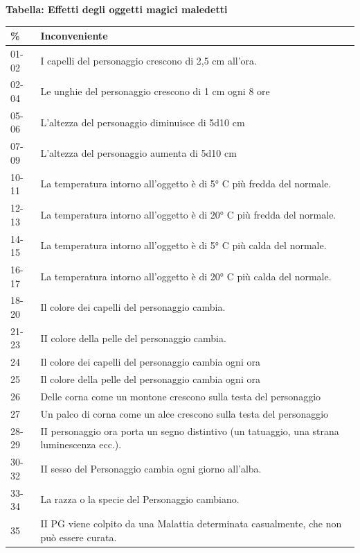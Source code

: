 \pagebreak

\textbf{Tabella: Effetti degli oggetti magici maledetti}

\medskip

\noindent\begin{tabularx}{\linewidth}{lX}
	\toprule
\rowcolor{gray!20}\textbf{\%} & \textbf{Inconveniente}\\
\toprule
01-02& I capelli del personaggio crescono di 2,5 cm all'ora.\\
\rowcolor{gray!20}02-04& Le unghie del personaggio crescono di 1 cm ogni 8 ore\\
05-06 & L'altezza del personaggio diminuisce di 5d10 cm \\
\rowcolor{gray!20}07-09 & L'altezza del personaggio aumenta di 5d10 cm \\
10-11 & La temperatura intorno all'oggetto è di 5° C più fredda del normale.\\
\rowcolor{gray!20}12-13 & La temperatura intorno all'oggetto è di 20° C più fredda del normale.\\
14-15 & La temperatura intorno all'oggetto è di 5° C più calda del normale.\\
\rowcolor{gray!20}16-17 & La temperatura intorno all'oggetto è di 20° C più calda del normale.\\
18-20 & Il colore dei capelli del personaggio cambia.\\
\rowcolor{gray!20}21-23 & II colore della pelle del personaggio cambia.\\
24& Il colore dei capelli del personaggio cambia ogni ora\\
\rowcolor{gray!20}25& Il colore della pelle del personaggio cambia ogni ora\\
26& Delle corna come un montone crescono sulla testa del personaggio\\
\rowcolor{gray!20}27& Un palco di corna come un alce crescono sulla testa del personaggio\\
28-29 & II personaggio ora porta un segno distintivo (un tatuaggio, una strana luminescenza ecc.).\\
\rowcolor{gray!20}30-32 & II sesso del Personaggio cambia ogni giorno all'alba.\\
33-34 & La razza o la specie del Personaggio cambiano.\\
\rowcolor{gray!20}35& II PG viene colpito da una Malattia determinata casualmente, che non può essere curata.\\

\end{tabularx}
